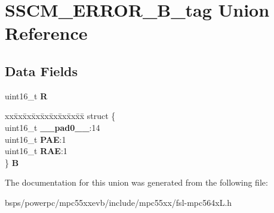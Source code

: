 \hypertarget{unionSSCM__ERROR__16B__tag}{}\section{S\+S\+C\+M\+\_\+\+E\+R\+R\+O\+R\+\_\+B\+\_\+tag Union Reference}
\label{unionSSCM__ERROR__16B__tag}
\subsection*{Data Fields}
\begin{DoxyCompactItemize}
\item 
\mbox{\label{unionSSCM__ERROR__16B__tag_a9cd3c443b624f89b3d7c81f48f84dd43}} 
uint16\+\_\+t {\bfseries R}
\item 
\mbox{\label{unionSSCM__ERROR__16B__tag_a82af1c78fb0d1813f3b1299d92c3420f}} 
\begin{tabbing}
xx\=xx\=xx\=xx\=xx\=xx\=xx\=xx\=xx\=\kill
struct \{\\
\>uint16\_t {\bfseries \_\_pad0\_\_}:14\\
\>uint16\_t {\bfseries PAE}:1\\
\>uint16\_t {\bfseries RAE}:1\\
\} {\bfseries B}\\

\end{tabbing}\end{DoxyCompactItemize}


The documentation for this union was generated from the following file\+:\begin{DoxyCompactItemize}
\item 
bsps/powerpc/mpc55xxevb/include/mpc55xx/fsl-\/mpc564x\+L.\+h\end{DoxyCompactItemize}
